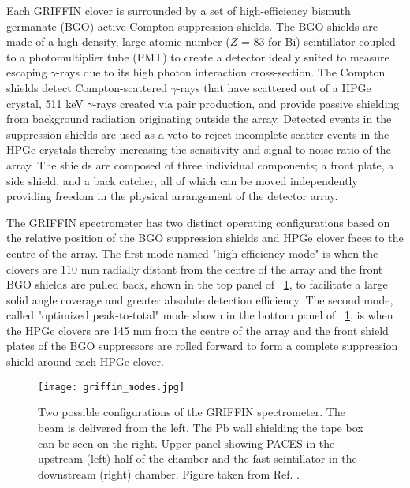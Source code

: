 \documentclass[cnatzke_thesis_proposal.tex]{subfiles}
\begin{document}
Each GRIFFIN clover is surrounded by a set of high-efficiency bismuth germanate (BGO) active Compton suppression shields.
The BGO shields are made of a high-density, large atomic number ($Z$ = 83 for Bi) scintillator coupled to a photomultiplier tube (PMT) to create a detector ideally suited to measure escaping $\gamma$-rays due to its high photon interaction cross-section. 
The Compton shields detect Compton-scattered $\gamma$-rays that have scattered out of a HPGe crystal, 511 keV $\gamma$-rays created via pair production, and provide passive shielding from background radiation originating outside the array. 
Detected events in the suppression shields are used as a veto to reject incomplete scatter events in the HPGe crystals thereby increasing the sensitivity and signal-to-noise ratio of the array. 
The shields are composed of three individual components; a front plate, a side shield, and a back catcher, all of which can be moved independently providing freedom in the physical arrangement of the detector array. 

The GRIFFIN spectrometer has two distinct operating configurations based on the relative position of the BGO suppression shields and HPGe clover faces to the centre of the array. 
The first mode named "high-efficiency mode" is when the clovers are 110 mm radially distant from the centre of the array and the front BGO shields are pulled back, shown in the top panel of ~\ref{fig:griffin_modes}, to facilitate a large solid angle coverage and greater absolute detection efficiency. 
The second mode, called "optimized peak-to-total" mode shown in the bottom panel of ~\ref{fig:griffin_modes}, is when the HPGe clovers are 145 mm from the centre of the array and the front shield plates of the BGO suppressors are rolled forward to form a complete suppression shield around each HPGe clover.  

\begin{center}
  \begin{figure}[H]
    \begin{center}
      \texttt{[image: griffin\_modes.jpg]}
    \end{center}
    \caption{Two possible configurations of the GRIFFIN spectrometer. The beam is delivered from the left. The Pb wall shielding the tape box can be seen on the right. Upper panel showing PACES in the upstream (left) half of the chamber and the fast scintillator in the downstream (right) chamber. Figure taken from Ref. \cite{garnsworthy_griffin_2019}.}
    \label{fig:griffin_modes}
  \end{figure}
\end{center}
\end{document}
